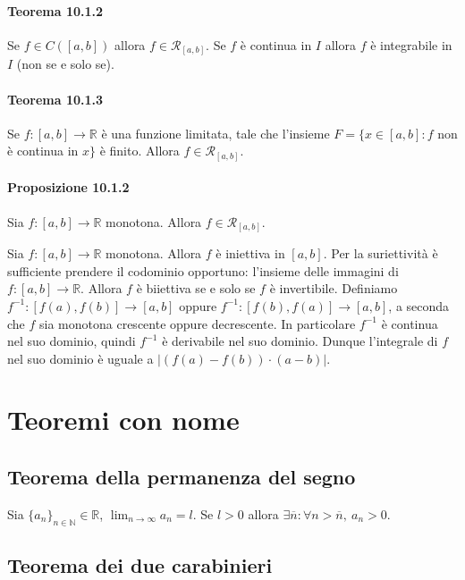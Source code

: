 \documentclass{article}
\begin{document}
\paragraph{Teorema 10.1.2} Se $f\in C([a,b])$ allora $f\in \mathcal{R}_{[a,b]}$. Se $f$ è continua in $I$ allora $f$ è integrabile in $I$ (non se e solo se).

\paragraph{Teorema 10.1.3} Se $f:[a,b] \rightarrow \mathbb{R}$ è una funzione limitata, tale che l'insieme $F=\{x \in [a,b]:f $ non è continua in $ x\}$ è finito. Allora $f\in \mathcal{R}_[a,b]$.

\paragraph{Proposizione 10.1.2} Sia $f:[a,b] \rightarrow \mathbb{R}$ monotona. Allora $f \in \mathcal{R}_{[a,b]}$.

 Sia $f:[a,b] \rightarrow \mathbb{R}$ monotona. Allora $f$ è iniettiva in $[a,b]$. Per la suriettività è sufficiente prendere il codominio opportuno: l'insieme delle immagini di $f:[a,b] \rightarrow \mathbb{R}$. Allora $f$ è biiettiva se e solo se $f$ è invertibile. Definiamo $f^{-1}:[f(a),f(b)]\rightarrow [a,b]$ oppure $f^{-1}:[f(b),f(a)]\rightarrow [a,b]$, a seconda che $f$ sia monotona crescente oppure decrescente.
In particolare $f^{-1}$ è continua nel suo dominio, quindi $f^{-1}$ è derivabile nel suo dominio. Dunque l'integrale di $f$ nel suo dominio è uguale a $|(f(a)- f(b))\cdot(a-b)|$.
\\

\section{Teoremi con nome}

\subsection{Teorema della permanenza del segno}

Sia $\{a_n\}_{n \in \mathbb{N}} \in \mathbb{R}$, $\lim_{n \to \infty}a_n= l$. Se $l>0$ allora $\exists \overline n : \forall n> \overline n, \ a_n>0 $.

\subsection{Teorema dei due carabinieri}
\end{document}
